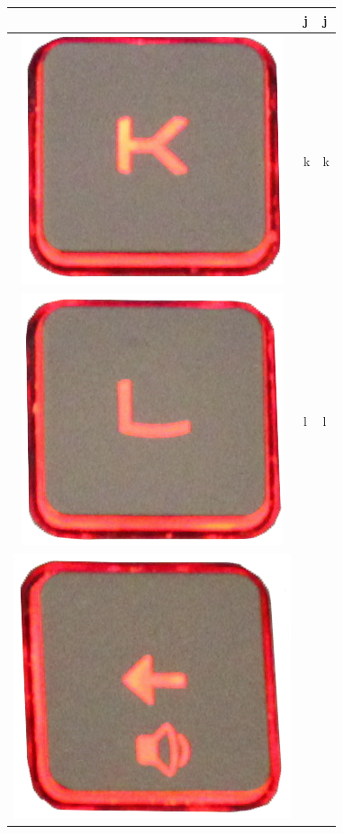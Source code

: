 \begin{longtable}{|cll|}
\begin{minipage}[c]{.4\textwidth}
\vspace{0.2cm}
\end{minipage} & j & j\\
\hline
\begin{minipage}[c]{.4\textwidth}
\vspace{0.2cm}
\includegraphics[scale=0.08]{Images/KeyMapping/k}
\vspace{0.2cm}
\end{minipage} & k & k\\
\hline
\begin{minipage}[c]{.4\textwidth}
\vspace{0.2cm}
\includegraphics[scale=0.08]{Images/KeyMapping/l}
\vspace{0.2cm}
\end{minipage} & l & l\\
\hline
\begin{minipage}[c]{.4\textwidth}
\vspace{0.2cm}
\includegraphics[scale=0.08]{Images/KeyMapping/LEFT}

\end{minipage}
\end{longtable}
